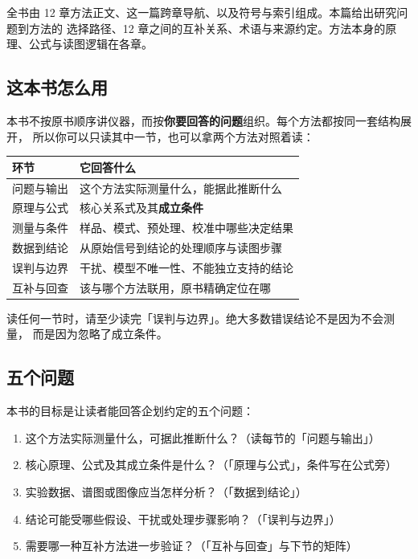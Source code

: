 
%
{全书由 12 章方法正文、这一篇跨章导航、以及符号与索引组成。本篇给出研究问题到方法的
选择路径、12 章之间的互补关系、术语与来源约定。方法本身的原理、公式与读图逻辑在各章。}

\subsection{这本书怎么用}

本书不按原书顺序讲仪器，而按\textbf{你要回答的问题}组织。每个方法都按同一套结构展开，
所以你可以只读其中一节，也可以拿两个方法对照着读：

\begin{center}
{\srcsize
\begin{tabularx}{\columnwidth}{@{}lX@{}}
\toprule
环节 & 它回答什么 \\
\midrule
问题与输出 & 这个方法实际测量什么，能据此推断什么 \\
原理与公式 & 核心关系式及其\textbf{成立条件} \\
测量与条件 & 样品、模式、预处理、校准中哪些决定结果 \\
数据到结论 & 从原始信号到结论的处理顺序与读图步骤 \\
误判与边界 & 干扰、模型不唯一性、不能独立支持的结论 \\
互补与回查 & 该与哪个方法联用，原书精确定位在哪 \\
\bottomrule
\end{tabularx}}
\end{center}

读任何一节时，请至少读完「误判与边界」。绝大多数错误结论不是因为不会测量，
而是因为忽略了成立条件。

\subsection{五个问题}

本书的目标是让读者能回答企划约定的五个问题：

\begin{enumerate}
\item 这个方法实际测量什么，可据此推断什么？（读每节的「问题与输出」）
\item 核心原理、公式及其成立条件是什么？（「原理与公式」，条件写在公式旁）
\item 实验数据、谱图或图像应当怎样分析？（「数据到结论」）
\item 结论可能受哪些假设、干扰或处理步骤影响？（「误判与边界」）
\item 需要哪一种互补方法进一步验证？（「互补与回查」与下节的矩阵）
\end{enumerate}

